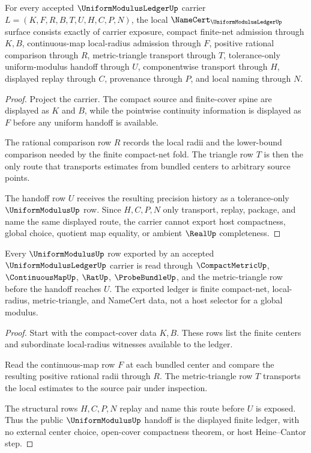 \begin{theorem}
\label{thm:uniform-modulus-ledger-namecert-obligations}
For every accepted $\UniformModulusLedgerUp$ carrier $L=(K,F,R,B,T,U,H,C,P,N)$, the local $\NameCert_{\UniformModulusLedgerUp}$ surface consists exactly of carrier exposure, compact finite-net admission through $K,B$, continuous-map local-radius admission through $F$, positive rational comparison through $R$, metric-triangle transport through $T$, tolerance-only uniform-modulus handoff through $U$, componentwise transport through $H$, displayed replay through $C$, provenance through $P$, and local naming through $N$.
\end{theorem}
\begin{proof}
Project the carrier. The compact source and finite-cover spine are displayed as $K$ and $B$, while the pointwise continuity information is displayed as $F$ before any uniform handoff is available.

The rational comparison row $R$ records the local radii and the lower-bound comparison needed by the finite compact-net fold. The triangle row $T$ is then the only route that transports estimates from bundled centers to arbitrary source points.

The handoff row $U$ receives the resulting precision history as a tolerance-only $\UniformModulusUp$ row. Since $H,C,P,N$ only transport, replay, package, and name the same displayed route, the carrier cannot export host compactness, global choice, quotient map equality, or ambient $\RealUp$ completeness.
\end{proof}

\begin{theorem}
\label{thm:uniform-modulus-ledger-compact-cover-handoff}
Every $\UniformModulusUp$ row exported by an accepted $\UniformModulusLedgerUp$ carrier is read through $\CompactMetricUp$, $\ContinuousMapUp$, $\RatUp$, $\ProbeBundleUp$, and the metric-triangle row before the handoff reaches $U$. The exported ledger is finite compact-net, local-radius, metric-triangle, and NameCert data, not a host selector for a global modulus.
\end{theorem}
\begin{proof}
Start with the compact-cover data $K,B$. These rows list the finite centers and subordinate local-radius witnesses available to the ledger.

Read the continuous-map row $F$ at each bundled center and compare the resulting positive rational radii through $R$. The metric-triangle row $T$ transports the local estimates to the source pair under inspection.

The structural rows $H,C,P,N$ replay and name this route before $U$ is exposed. Thus the public $\UniformModulusUp$ handoff is the displayed finite ledger, with no external center choice, open-cover compactness theorem, or host Heine--Cantor step.
\end{proof}

